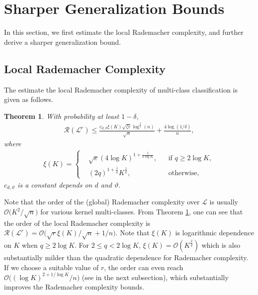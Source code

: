 \documentclass{article}
\newtheorem{theorem}{Theorem}
\newtheorem{remark}{Remark}
\begin{document}
\section{Sharper Generalization Bounds}
In this section, we first estimate the local Rademacher complexity,
and further derive a sharper generalization bound.

\subsection{Local Rademacher Complexity}
The estimate the local Rademacher complexity of multi-class classification is given as follows.
\begin{theorem}
\label{rademacherlocal}
  With probability at least $1-\delta$,
  \begin{align*}
    \mathcal{R}(\mathcal{L}^r) \leq \frac{c_{d,\vartheta}\xi(K)\sqrt{\zeta r}\log^{\frac{3}{2}}(n)}{\sqrt{n}}+\frac{4\log(1/\delta)}{n},
  \end{align*}
  where
  \begin{align*}
  \xi(K)=
  \left\{
      \begin{aligned}
      &\sqrt{e}(4\log K)^{1+\frac{1}{2\log K}}, &&\text{if } q\geq 2\log K,\\
      &(2q)^{1+\frac{1}{q}}K^{\frac{1}{q}}, &&\text{otherwise},
      \end{aligned}
      \right.
  \end{align*}
  $c_{d,\vartheta}$ is a constant depends on $d$ and $\vartheta$.
\end{theorem}
Note that the order of the (global) Rademacher complexity over $\mathcal{L}$ is usually
$\mathcal{O}\big({K^2}/{\sqrt{n}}\big)$ for various kernel multi-classes.
From Theorem \ref{rademacherlocal}, one can see that the order of the local Rademacher complexity is
$
  \mathcal{R}(\mathcal{L}^r)=\mathcal{O}\big({\sqrt{r}\xi(K)}/{\sqrt{n}}+{1}/{n}\big).
$
Note that $\xi(K)$ is logarithmic dependence on $K$ when $q\geq 2\log K$.
For $2\leq q < 2\log K$, $\xi(K)=\mathcal{O}(K^{\frac{2}{q}})$
which is also substantially milder than the quadratic dependence for Rademacher complexity.
If we choose a suitable value of $r$,
the order can even reach $\mathcal{O}\big({(\log K)^{2+1/\log K}}/{n}\big)$ (see in the next subsection),
which substantially improves the Rademacher complexity bounds.
\end{document}

